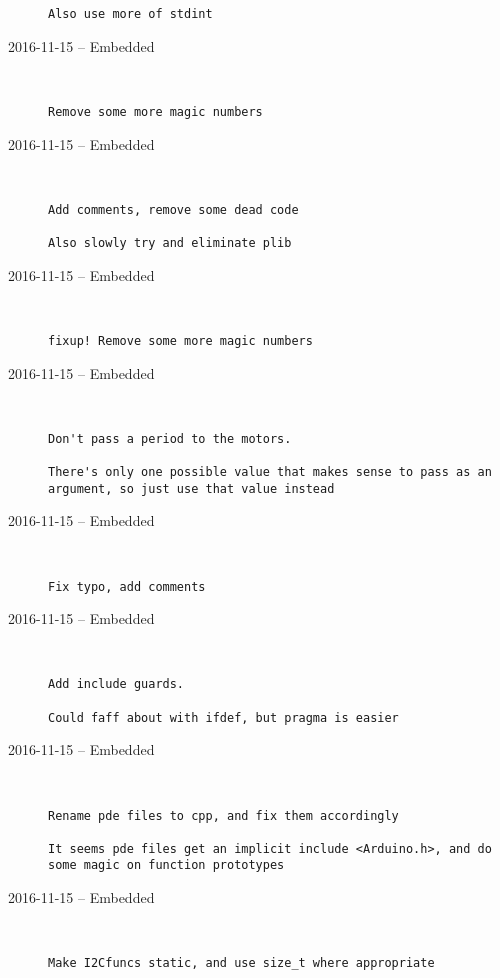 \begin{description}
\begin{lstlisting}
Also use more of stdint
\end{lstlisting}


  \item[2016-11-15 -- Embedded] \hfill \
\begin{lstlisting}
Remove some more magic numbers
\end{lstlisting}


  \item[2016-11-15 -- Embedded] \hfill \
\begin{lstlisting}
Add comments, remove some dead code

Also slowly try and eliminate plib
\end{lstlisting}


  \item[2016-11-15 -- Embedded] \hfill \
\begin{lstlisting}
fixup! Remove some more magic numbers
\end{lstlisting}


  \item[2016-11-15 -- Embedded] \hfill \
\begin{lstlisting}
Don't pass a period to the motors.

There's only one possible value that makes sense to pass as an argument, so just use that value instead
\end{lstlisting}


  \item[2016-11-15 -- Embedded] \hfill \
\begin{lstlisting}
Fix typo, add comments
\end{lstlisting}


  \item[2016-11-15 -- Embedded] \hfill \
\begin{lstlisting}
Add include guards.

Could faff about with ifdef, but pragma is easier
\end{lstlisting}


  \item[2016-11-15 -- Embedded] \hfill \
\begin{lstlisting}
Rename pde files to cpp, and fix them accordingly

It seems pde files get an implicit include <Arduino.h>, and do some magic on function prototypes
\end{lstlisting}


  \item[2016-11-15 -- Embedded] \hfill \
\begin{lstlisting}
Make I2Cfuncs static, and use size_t where appropriate
\end{lstlisting}



\end{description}
